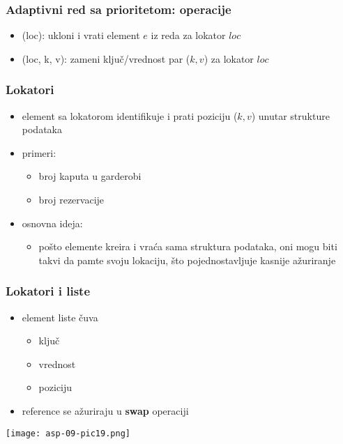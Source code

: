 \documentclass[compress,aspectratio=169]{beamer}
\begin{document}
\begin{frame}[fragile]
  \frametitle{Adaptivni red sa prioritetom: operacije}
  \begin{itemize}
    \item {}(loc): ukloni i vrati element $e$ iz reda za lokator
    $loc$
    \item {}(loc, k, v): zameni ključ/vrednost par ($k, v$) za
    lokator $loc$
  \end{itemize}
\end{frame}

\begin{frame}[fragile]
  \frametitle{Lokatori}
  \begin{itemize}
    \item element sa lokatorom identifikuje i prati poziciju ($k, v$) unutar
    strukture podataka
    \item primeri:
    \begin{itemize}
      \item broj kaputa u garderobi
      \item broj rezervacije 
    \end{itemize}
    \item osnovna ideja:
    \begin{itemize}
      \item pošto elemente kreira i vraća sama struktura podataka, oni mogu biti
      takvi da pamte svoju lokaciju, što pojednostavljuje kasnije ažuriranje
    \end{itemize}
  \end{itemize}
\end{frame}

\begin{frame}[fragile]
  \frametitle{Lokatori i liste}
  \begin{itemize}
    \item element liste čuva
    \begin{itemize}
      \item ključ
      \item vrednost
      \item poziciju 
    \end{itemize}
    \item reference se ažuriraju u \textbf{swap} operaciji
  \end{itemize}
  \begin{center}
    \texttt{[image: asp-09-pic19.png]}
  \end{center}
\end{frame}
\end{document}
